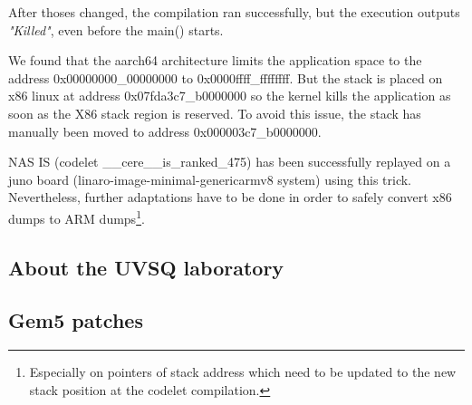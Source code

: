 \documentclass{article}
\begin{document}
\begin{multicols}{2}
After thoses changed, the compilation ran successfully, but the execution outputs \textit{"Killed"}, even before the main() starts.


We found that the aarch64 architecture limits the application space to the address 0x00000000\_00000000 to 0x0000ffff\_ffffffff\cite{aarch64-mmu}.
 But the stack is placed on x86 linux at address 0x07fda3c7\_b0000000 so the kernel kills the application as soon as the X86 stack region is reserved.
To avoid this issue, the stack has manually been moved to address 0x000003c7\_b0000000.

NAS IS (codelet \_\_cere\_\_is\_ranked\_475) has been successfully replayed on a juno board (linaro-image-minimal-genericarmv8 system) using this trick. Nevertheless, further adaptations have to be done in order to safely convert x86 dumps to ARM dumps\footnote{Especially on pointers of stack address which need to be updated to the new stack position at the codelet compilation.}.


\subsection{About the UVSQ laboratory}

\subsection{Gem5 patches}

\end{multicols}
\end{document}
